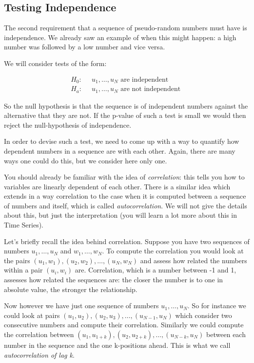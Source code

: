 \documentclass[
]{book}
\theoremstyle{definition}
\theoremstyle{definition}
\theoremstyle{definition}
\theoremstyle{definition}
\theoremstyle{remark}
\begin{document}
\hypertarget{testing-independence}{%
\subsection{Testing Independence}\label{testing-independence}}

The second requirement that a sequence of pseudo-random numbers must have is independence. We already saw an example of when this might happen: a high number was followed by a low number and vice versa.

We will consider tests of the form:

\begin{align*}
H_0: & \;\;u_1,\dots,u_N \mbox{ are independent }\\
H_a: & \;\;u_1,\dots,u_N \mbox{ are not independent }
\end{align*}

So the null hypothesis is that the sequence is of independent numbers against the alternative that they are not. If the p-value of such a test is small we would then reject the null-hypothesis of independence.

In order to devise such a test, we need to come up with a way to quantify how dependent numbers in a sequence are with each other. Again, there are many ways one could do this, but we consider here only one.

You should already be familiar with the idea of \emph{correlation}: this tells you how to variables are linearly dependent of each other. There is a similar idea which extends in a way correlation to the case when it is computed between a sequence of numbers and itself, which is called \emph{autocorrelation}. We will not give the details about this, but just the interpretation (you will learn a lot more about this in Time Series).

Let's briefly recall the idea behind correlation. Suppose you have two sequences of numbers \(u_1,\dots,u_N\) and \(w_1,\dots,w_N\). To compute the correlation you would look at the pairs \((u_1,w_1),(u_2,w_2),\dots, (u_N,w_N)\) and assess how related the numbers within a pair \((u_i,w_i)\) are. Correlation, which is a number between -1 and 1, assesses how related the sequences are: the closer the number is to one in absolute value, the stronger the relationship.

Now however we have just one sequence of numbers \(u_1,\dots,u_N\). So for instance we could look at pairs \((u_1,u_2), (u_2,u_3), \dots, (u_{N-1},u_{N})\) which consider two consecutive numbers and compute their correlation. Similarly we could compute the correlation between \((u_1,u_{1+k}), (u_2,u_{2+k}),\dots, (u_{N-k},u_N)\) between each number in the sequence and the one k-positions ahead. This is what we call \emph{autocorrelation of lag k}.
\end{document}
